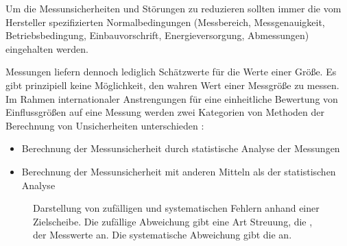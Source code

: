 \documentclass[letterpaper,10pt,english]{jupyterBook}
\let\sphinxpxdimen\pdfpxdimen\else\newdimen\sphinxpxdimen
\begin{document}
\sphinxAtStartPar
Um die Messunsicherheiten und Störungen zu reduzieren sollten immer die vom Hersteller spezifizierten Normalbedingungen (Messbereich, Messgenauigkeit, Betriebsbedingung, Einbauvorschrift, Energieversorgung, Abmessungen) eingehalten werden.

\sphinxAtStartPar
Messungen liefern dennoch lediglich Schätzwerte für die  Werte einer Größe. Es gibt prinzipiell keine Möglichkeit, den wahren Wert einer Messgröße zu messen. Im Rahmen internationaler Anstrengungen für eine einheitliche Bewertung von Einflussgrößen auf eine Messung werden zwei Kategorien von Methoden der Berechnung von Unsicherheiten unterschieden :
\begin{itemize}
\item {} 
\sphinxAtStartPar
{} Berechnung der Messunsicherheit durch statistische Analyse der Messungen

\item {} 
\sphinxAtStartPar
{} Berechnung der Messunsicherheit mit anderen Mitteln als der statistischen Analyse

\end{itemize}

\begin{figure}[htbp]
\centering
\capstart

\noindent\sphinxincludegraphics[width=800\sphinxpxdimen]{{zielscheibe}.jpg}
\caption{Darstellung von zufälligen und systematischen Fehlern anhand einer Zielscheibe. Die zufällige Abweichung gibt eine Art Streuung, die , der Messwerte an. Die systematische Abweichung gibt die  an.}\label{\detokenize{content/1_Messunsicherheiten:zielscheibe}}\end{figure}
\end{document}
